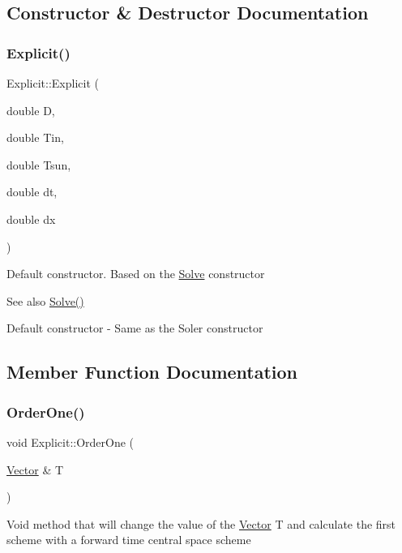 \subsection{Constructor \& Destructor Documentation}
\mbox{\label{class_explicit_ab5b890fae2ea8a91c95e9a15f552f36a}} 
\subsubsection{\texorpdfstring{Explicit()}{Explicit()}}
{\footnotesize\ttfamily Explicit\+::\+Explicit (\begin{DoxyParamCaption}\item[{double}]{D,  }\item[{double}]{Tin,  }\item[{double}]{Tsun,  }\item[{double}]{dt,  }\item[{double}]{dx }\end{DoxyParamCaption})}

Default constructor. Based on the \hyperlink{class_solve}{Solve} constructor \begin{DoxySeeAlso}{See also}
\hyperlink{class_solve_a1e0efad6dcf6b09759dd38df7aa08db8}{Solve()}
\end{DoxySeeAlso}
Default constructor -\/ Same as the Soler constructor 

\subsection{Member Function Documentation}
\mbox{\label{class_explicit_a6069720017eb2bb0d989b2557c162c97}} 
\subsubsection{\texorpdfstring{Order\+One()}{OrderOne()}}
{\footnotesize\ttfamily void Explicit\+::\+Order\+One (\begin{DoxyParamCaption}\item[{\hyperlink{class_vector}{Vector} \&}]{T }\end{DoxyParamCaption})}

Void method that will change the value of the \hyperlink{class_vector}{Vector} T and calculate the first scheme with a forward time central space scheme

